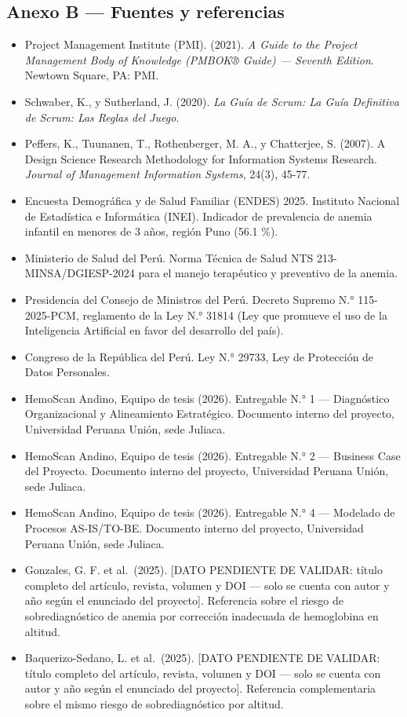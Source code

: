 \documentclass[11pt,a4paper]{article}
\providecommand{\tightlist}{%
  \setlength{\itemsep}{0pt}\setlength{\parskip}{0pt}}
\begin{document}
\subsection{Anexo B --- Fuentes y referencias}\label{anexo-b-fuentes-y-referencias}

\begin{itemize}
\tightlist
\item
  Project Management Institute (PMI). (2021). \emph{A Guide to the Project Management Body of Knowledge (PMBOK® Guide) --- Seventh Edition}. Newtown Square, PA: PMI.
\item
  Schwaber, K., y Sutherland, J. (2020). \emph{La Guía de Scrum: La Guía Definitiva de Scrum: Las Reglas del Juego}.
\item
  Peffers, K., Tuunanen, T., Rothenberger, M. A., y Chatterjee, S. (2007). A Design Science Research Methodology for Information Systems Research. \emph{Journal of Management Information Systems}, 24(3), 45-77.
\item
  Encuesta Demográfica y de Salud Familiar (ENDES) 2025. Instituto Nacional de Estadística e Informática (INEI). Indicador de prevalencia de anemia infantil en menores de 3 años, región Puno (56.1 \%).
\item
  Ministerio de Salud del Perú. Norma Técnica de Salud NTS 213-MINSA/DGIESP-2024 para el manejo terapéutico y preventivo de la anemia.
\item
  Presidencia del Consejo de Ministros del Perú. Decreto Supremo N.° 115-2025-PCM, reglamento de la Ley N.° 31814 (Ley que promueve el uso de la Inteligencia Artificial en favor del desarrollo del país).
\item
  Congreso de la República del Perú. Ley N.° 29733, Ley de Protección de Datos Personales.
\item
  HemoScan Andino, Equipo de tesis (2026). Entregable N.° 1 --- Diagnóstico Organizacional y Alineamiento Estratégico. Documento interno del proyecto, Universidad Peruana Unión, sede Juliaca.
\item
  HemoScan Andino, Equipo de tesis (2026). Entregable N.° 2 --- Business Case del Proyecto. Documento interno del proyecto, Universidad Peruana Unión, sede Juliaca.
\item
  HemoScan Andino, Equipo de tesis (2026). Entregable N.° 4 --- Modelado de Procesos AS-IS/TO-BE. Documento interno del proyecto, Universidad Peruana Unión, sede Juliaca.
\item
  Gonzales, G. F. et al.~(2025). {[}DATO PENDIENTE DE VALIDAR: título completo del artículo, revista, volumen y DOI --- solo se cuenta con autor y año según el enunciado del proyecto{]}. Referencia sobre el riesgo de sobrediagnóstico de anemia por corrección inadecuada de hemoglobina en altitud.
\item
  Baquerizo-Sedano, L. et al.~(2025). {[}DATO PENDIENTE DE VALIDAR: título completo del artículo, revista, volumen y DOI --- solo se cuenta con autor y año según el enunciado del proyecto{]}. Referencia complementaria sobre el mismo riesgo de sobrediagnóstico por altitud.
\end{itemize}
\end{document}
